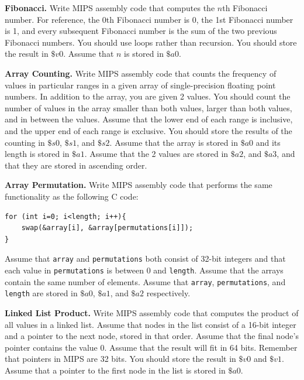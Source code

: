 \documentclass{exam}
\begin{document}
\begin{questions}

\question[10]
\textbf{Fibonacci.}
Write MIPS assembly code that computes the $n$th Fibonacci number. 
For reference, the 0th Fibonacci number is 0, the 1st Fibonacci number is 1, and every subsequent Fibonacci number is the sum of the two previous Fibonacci numbers. 
You should use loops rather than recursion. 
You should store the result in $\$v0$. 
Assume that $n$ is stored in $\$a0$. 

\question[10]
\textbf{Array Counting.}
Write MIPS assembly code that counts the frequency of values in particular ranges in a given array of single-precision floating point numbers. 
In addition to the array, you are given 2 values. 
You should count the number of values in the array smaller than both values, larger than both values, and in between the values. 
Assume that the lower end of each range is inclusive, and the upper end of each range is exclusive. 
You should store the results of the counting in $\$s0$, $\$s1$, and $\$s2$. 
Assume that the array is stored in $\$a0$ and its length is stored in $\$a1$. 
Assume that the 2 values are stored in  $\$a2$, and $\$a3$, and that they are stored in ascending order. 

\question[10]
\textbf{Array Permutation.}
Write MIPS assembly code that performs the same functionality as the following C code:
\begin{verbatim}
for (int i=0; i<length; i++){
    swap(&array[i], &array[permutations[i]]);
}
\end{verbatim}
Assume that \texttt{array} and \texttt{permutations} both consist of 32-bit integers and that each value in \texttt{permutations} is between 0 and \texttt{length}. 
Assume that the arrays contain the same number of elements. 
Assume that \texttt{array}, \texttt{permutations}, and \texttt{length} are stored in $\$a0$, $\$a1$, and $\$a2$ respectively. 

\question[10]
\textbf{Linked List Product.}
Write MIPS assembly code that computes the product of all values in a linked list. 
Assume that nodes in the list consist of a 16-bit integer and a pointer to the next node, stored in that order. 
Assume that the final node's pointer contains the value 0. 
Assume that the result will fit in 64 bits. 
Remember that pointers in MIPS are 32 bits. 
You should store the result in $\$v0$ and $\$v1$. 
Assume that a pointer to the first node in the list is stored in $\$a0$. 


\end{questions}
\end{document}
